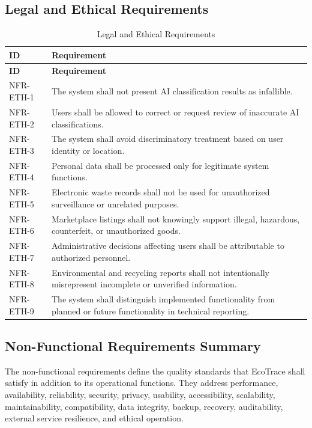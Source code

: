 \subsection{Legal and Ethical Requirements}
\begin{longtable}{@{}p{2.6cm}p{10.8cm}@{}}
\caption{Legal and Ethical Requirements} \label{tab:nfr-eth} \\
\toprule \textbf{ID} & \textbf{Requirement} \\ \midrule
\endfirsthead
\toprule \textbf{ID} & \textbf{Requirement} \\ \midrule
\endhead
NFR-ETH-1 & The system shall not present AI classification results as infallible. \\
NFR-ETH-2 & Users shall be allowed to correct or request review of inaccurate AI classifications. \\
NFR-ETH-3 & The system shall avoid discriminatory treatment based on user identity or location. \\
NFR-ETH-4 & Personal data shall be processed only for legitimate system functions. \\
NFR-ETH-5 & Electronic waste records shall not be used for unauthorized surveillance or unrelated purposes. \\
NFR-ETH-6 & Marketplace listings shall not knowingly support illegal, hazardous, counterfeit, or unauthorized goods. \\
NFR-ETH-7 & Administrative decisions affecting users shall be attributable to authorized personnel. \\
NFR-ETH-8 & Environmental and recycling reports shall not intentionally misrepresent incomplete or unverified information. \\
NFR-ETH-9 & The system shall distinguish implemented functionality from planned or future functionality in technical reporting. \\
\bottomrule
\end{longtable}

\subsection{Non-Functional Requirements Summary}

The non-functional requirements define the quality standards that EcoTrace
shall satisfy in addition to its operational functions. They address performance,
availability, reliability, security, privacy, usability, accessibility, scalability,
maintainability, compatibility, data integrity, backup, recovery, auditability,
external service resilience, and ethical operation.


